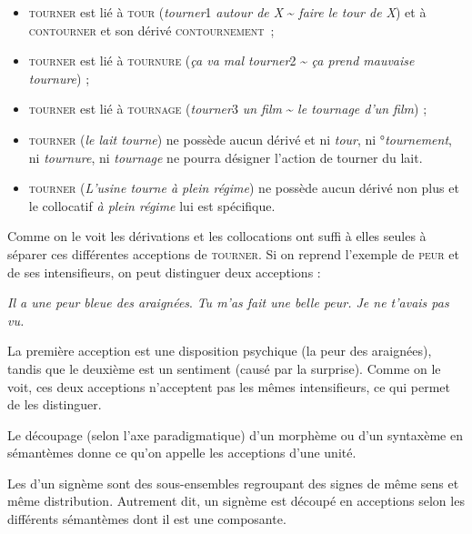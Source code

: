 \begin{itemize}
\item \textsc{tourner} est lié à \textsc{tour} (\textit{tourner}1 \textit{autour de X} {\textasciitilde} \textit{faire le tour de X}) et à \textsc{contourner} et son dérivé \textsc{contournement~};
\item \textsc{tourner} est lié à \textsc{tournure} (\textit{ça va mal tourner}2 {\textasciitilde} \textit{ça prend mauvaise tournure}) ;
\item \textsc{tourner} est lié à \textsc{tournage} (\textit{tourner}3 \textit{un film} {\textasciitilde} \textit{le tournage d’un film}) ;
\item \textsc{tourner} (\textit{le lait tourne}) ne possède aucun dérivé et ni \textit{tour}, ni °\textit{tournement}, ni \textit{tournure}, ni \textit{tournage} ne pourra désigner l’action de tourner du lait.
\item \textsc{tourner} (\textit{L’usine tourne à plein régime}) ne possède aucun dérivé non plus et le collocatif \textit{à plein régime} lui est spécifique.
\end{itemize}

Comme on le voit les dérivations et les collocations ont suffi à elles seules à séparer ces différentes acceptions de \textsc{tourner}. Si on reprend l’exemple de \textsc{peur} et de ses intensifieurs, on peut distinguer deux acceptions :

\ea
    \ea \textit{Il a une peur bleue des araignées}.
    \ex \textit{Tu m’as fait une belle peur. Je ne t’avais pas vu.}
\z
\ex
{}
\z
\z

La première acception est une disposition psychique (la peur des araignées), tandis que le deuxième est un sentiment (causé par la surprise). Comme on le voit, ces deux acceptions n’acceptent pas les mêmes intensifieurs, ce qui permet de les distinguer.\largerpage

Le découpage (selon l’axe paradigmatique) d’un morphème ou d’un syntaxème en sémantèmes donne ce qu’on appelle les acceptions d’une unité.

{Les  d’un signème sont des sous-ensembles regroupant des signes de même sens et même distribution. Autrement dit, un signème est découpé en acceptions selon les différents sémantèmes dont il est une composante.}

